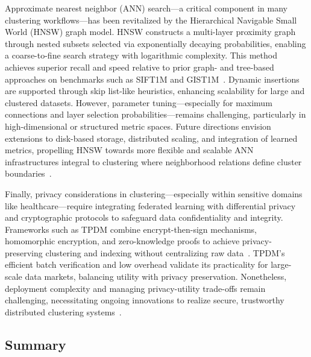 \documentclass[sigconf]{acmart}
\begin{document}
Approximate nearest neighbor (ANN) search—a critical component in many clustering workflows—has been revitalized by the Hierarchical Navigable Small World (HNSW) graph model. HNSW constructs a multi-layer proximity graph through nested subsets selected via exponentially decaying probabilities, enabling a coarse-to-fine search strategy with logarithmic complexity. This method achieves superior recall and speed relative to prior graph- and tree-based approaches on benchmarks such as SIFT1M and GIST1M~\cite{ref4}. Dynamic insertions are supported through skip list-like heuristics, enhancing scalability for large and clustered datasets. However, parameter tuning—especially for maximum connections and layer selection probabilities—remains challenging, particularly in high-dimensional or structured metric spaces. Future directions envision extensions to disk-based storage, distributed scaling, and integration of learned metrics, propelling HNSW towards more flexible and scalable ANN infrastructures integral to clustering where neighborhood relations define cluster boundaries~\cite{ref4}.

Finally, privacy considerations in clustering—especially within sensitive domains like healthcare—require integrating federated learning with differential privacy and cryptographic protocols to safeguard data confidentiality and integrity. Frameworks such as TPDM combine encrypt-then-sign mechanisms, homomorphic encryption, and zero-knowledge proofs to achieve privacy-preserving clustering and indexing without centralizing raw data~\cite{ref22,ref25}. TPDM’s efficient batch verification and low overhead validate its practicality for large-scale data markets, balancing utility with privacy preservation. Nonetheless, deployment complexity and managing privacy-utility trade-offs remain challenging, necessitating ongoing innovations to realize secure, trustworthy distributed clustering systems~\cite{ref22,ref25}.

\subsection*{Summary}
\end{document}
